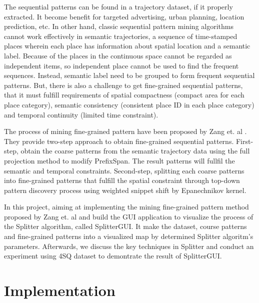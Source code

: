 \documentclass[conference]{IEEEtran}
\begin{document}
The sequential patterns can be found in a trajectory dataset, if it properly extracted. It become benefit for targeted advertising, urban planning, location prediction, etc. In other hand, classic sequential pattern mining algorithms cannot work effectively in semantic trajectories, a sequence of time-stamped places wherein each place has information about spatial location and a semantic label. Because of the places in the continuous space cannot be regarded as independent items, so independent place cannot be used to find the frequent sequences. Instead, semantic label need to be grouped to form frequent sequential patterns. But, there is also a challenge to get fine-grained sequential patterns, that it must fulfill requirements of spatial compactness (compact area for each place category), semantic consistency (consistent place ID in each place category) and temporal continuity (limited time constraint).
\par
The process of mining fine-grained pattern have been proposed by Zang et. al \cite{zhang2014splitter}. They provide two-step approach to obtain fine-grained sequential patterns. First-step, obtain the coarse patterns from the semantic trajectory data using the full projection method to modify PrefixSpan. The result patterns will fullfil the semantic and temporal constraints. Second-step, splitting each coarse patterns into fine-grained patterns that fulfill the spatial constraint through top-down pattern discovery process using weighted snippet shift by Epanechnikov kernel.
\par
In this project, aiming at implementing the mining fine-grained pattern method proposed by Zang et. al \cite{zhang2014splitter} and build the GUI application to visualize the process of the Splitter algorithm, called SplitterGUI. It make the dataset, course patterns and fine-grained patterns into a visualized map by determined Splitter algoritm's parameters. Afterwards, we discuss the key techniques in Splitter and conduct an experiment using 4SQ dataset to demontrate the result of SplitterGUI.

\section{Implementation}
\end{document}
